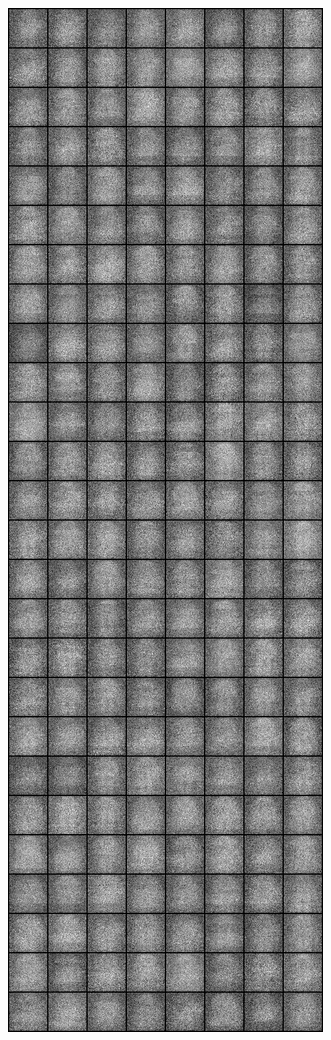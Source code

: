 \begin{figure}
\centering
\includegraphics[width=\picwidth\columnwidth]{figures/supplementary/alternative_fmnist/image_100.png}

\end{figure}

